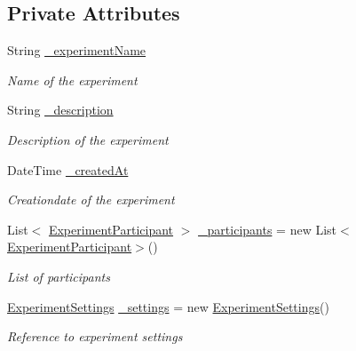 \subsection*{Private Attributes}
\begin{DoxyCompactItemize}
\item 
String \hyperlink{class_web_analyzer_1_1_models_1_1_base_1_1_experiment_model_a2e9168576a6110f27ea44886e19ff5da}{\+\_\+experiment\+Name}
\begin{DoxyCompactList}\small\item\em Name of the experiment \end{DoxyCompactList}\item 
String \hyperlink{class_web_analyzer_1_1_models_1_1_base_1_1_experiment_model_a55777bd2fa8b71c034d49baad38c6ea3}{\+\_\+description}
\begin{DoxyCompactList}\small\item\em Description of the experiment \end{DoxyCompactList}\item 
Date\+Time \hyperlink{class_web_analyzer_1_1_models_1_1_base_1_1_experiment_model_a406cd5a0a10b170f9182492f493cc05a}{\+\_\+created\+At}
\begin{DoxyCompactList}\small\item\em Creationdate of the experiment \end{DoxyCompactList}\item 
List$<$ \hyperlink{class_web_analyzer_1_1_models_1_1_base_1_1_experiment_participant}{Experiment\+Participant} $>$ \hyperlink{class_web_analyzer_1_1_models_1_1_base_1_1_experiment_model_ae9f31e30ec2c655a5c06de17f1e40a7c}{\+\_\+participants} = new List$<$\hyperlink{class_web_analyzer_1_1_models_1_1_base_1_1_experiment_participant}{Experiment\+Participant}$>$()
\begin{DoxyCompactList}\small\item\em List of participants \end{DoxyCompactList}\item 
\hyperlink{class_web_analyzer_1_1_models_1_1_settings_model_1_1_experiment_settings}{Experiment\+Settings} \hyperlink{class_web_analyzer_1_1_models_1_1_base_1_1_experiment_model_ae907589850044fa39b4f1991c60d95ad}{\+\_\+settings} = new \hyperlink{class_web_analyzer_1_1_models_1_1_settings_model_1_1_experiment_settings}{Experiment\+Settings}()
\begin{DoxyCompactList}\small\item\em Reference to experiment settings \end{DoxyCompactList}\end{DoxyCompactItemize}


